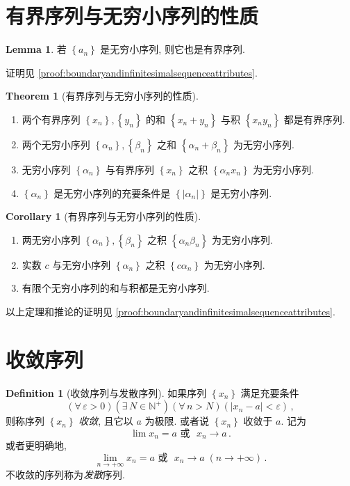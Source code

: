 \documentclass{book}
\newcommand{\Exists}{\exists\,}
\newcommand{\Any}{\forall\,}
\newcommand{\set}[1]{\left\{#1\right\}}
\newcommand{\abs}[1]{\left\lvert #1 \right\rvert}
\newcommand{\N}{\mathbb{N}}
\numberwithin{equation}{section}
\numberwithin{figure}{section}
\theoremstyle{definition}
\newtheorem{definition}{Definition}
\newtheorem{theorem}{Theorem}[section]
\newtheorem{lemma}{Lemma}[section]
\newtheorem{corollary}{Corollary}[section]
\begin{document}
\section{有界序列与无穷小序列的性质}
\begin{lemma}\label{lem:infinitesimalhasboundary}
  若 $\set{a_n}$ 是无穷小序列, 则它也是有界序列.
\end{lemma}
证明见 \cref{proof:boundaryandinfinitesimalsequenceattributes}.

\begin{theorem}[有界序列与无穷小序列的性质]
  \label{the:boundaryandinfinitesimalsequenceattributes}
  \leavevmode

  \begin{enumerate}
    \item 两个有界序列 $\set{x_n},\set{y_n}$ 的和 $\set{x_n+y_n}$ 与积 $\set{x_ny_n}$ 都是有界序列.
    \item 两个无穷小序列 $\set{\alpha_n},\set{\beta_n}$ 之和 $\set{\alpha_n+\beta_n}$ 为无穷小序列.
    \item 无穷小序列 $\set{\alpha_n}$ 与有界序列 $\set{x_n}$ 之积 $\set{\alpha_nx_n}$ 为无穷小序列.
    \item $\set{\alpha_n}$ 是无穷小序列的充要条件是 $\set{\abs{\alpha_n}}$ 是无穷小序列.
  \end{enumerate}
\end{theorem}
\begin{corollary}[有界序列与无穷小序列的性质]
  \label{cor:boundaryandinfinitesimalsequenceattributes}
  \leavevmode

  \begin{enumerate}[start=5]
    \item 两无穷小序列 $\set{\alpha_n},\set{\beta_n}$ 之积 $\set{\alpha_n\beta_n}$ 为无穷小序列.
    \item 实数 $c$ 与无穷小序列 $\set{\alpha_n}$ 之积 $\set{c\alpha_n}$ 为无穷小序列.
    \item 有限个无穷小序列的和与积都是无穷小序列.
  \end{enumerate}
\end{corollary}
以上定理和推论的证明见 \cref{proof:boundaryandinfinitesimalsequenceattributes}. 


\section{收敛序列}
\begin{definition}[收敛序列与发散序列]
  如果序列 $\set{x_n}$ 满足充要条件
  \begin{equation*}
    (\Any \varepsilon>0)(\Exists N\in\N^+)(\Any n>N)(\abs{x_n-a}<\varepsilon)\,,
  \end{equation*}
  则称序列 $\set{x_n}$ \emph{收敛}, 且它以 $a$ 为极限. 或者说 $\set{x_n}$ 收敛于 $a$. 记为
  \begin{equation*}
    \lim x_n=a\text{ 或{} } x_n\to a\,.
  \end{equation*}
  或者更明确地,
  \begin{equation*}
    \lim_{n\to+\infty}x_n=a\text{ 或{} }x_n\to a\;(n\to +\infty)\,.
  \end{equation*}
  不收敛的序列称为\emph{发散}序列.
\end{definition}
\end{document}

